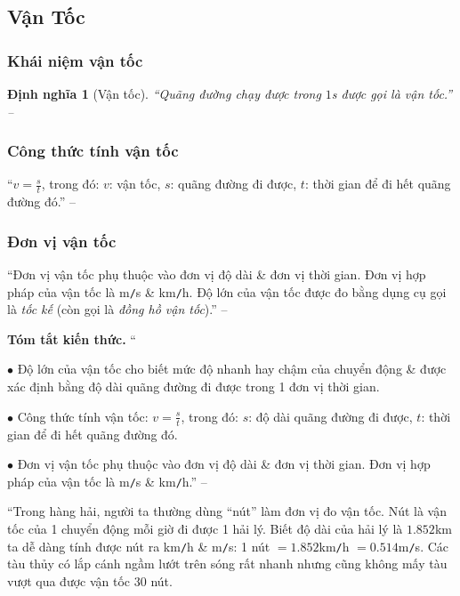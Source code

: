 \documentclass{article}
\numberwithin{equation}{section}
\newtheorem{dinhnghia}{Định nghĩa}[section]
\begin{document}
\subsection{Vận Tốc}

\subsubsection{Khái niệm vận tốc}

\begin{dinhnghia}[Vận tốc]
	``Quãng đường chạy được trong $1$s được gọi là \emph{vận tốc}.'' -- \cite[p. 8]{SGK_Vat_Ly_8}
\end{dinhnghia}

\subsubsection{Công thức tính vận tốc}
``$v = \frac{s}{t}$, trong đó: $v$: vận tốc, $s$: quãng đường đi được, $t$: thời gian để đi hết quãng đường đó.'' -- \cite[p. 9]{SGK_Vat_Ly_8}

\subsubsection{Đơn vị vận tốc}
``Đơn vị vận tốc phụ thuộc vào đơn vị độ dài \& đơn vị thời gian. Đơn vị hợp pháp của vận tốc là m\texttt{/}s \& km\texttt{/}h. Độ lớn của vận tốc được đo bằng dụng cụ gọi là \textit{tốc kế} (còn gọi là \textit{đồng hồ vận tốc}).'' -- \cite[p. 9]{SGK_Vat_Ly_8}
\vspace{2mm}

\noindent\textbf{Tóm tắt kiến thức.}
``\begin{enumerate*}
	\item[$\bullet$] Độ lớn của vận tốc cho biết mức độ nhanh hay chậm của chuyển động \& được xác định bằng độ dài quãng đường đi được trong 1 đơn vị thời gian.
	\item[$\bullet$] Công thức tính vận tốc: $v = \frac{s}{t}$, trong đó: $s$: độ dài quãng đường đi được, $t$: thời gian để đi hết quãng đường đó.
	\item[$\bullet$] Đơn vị vận tốc phụ thuộc vào đơn vị độ dài \& đơn vị thời gian. Đơn vị hợp pháp của vận tốc là m\texttt{/}s \& km\texttt{/}h.'' -- \cite[p. 10]{SGK_Vat_Ly_8}
\end{enumerate*}

``Trong hàng hải, người ta thường dùng ``nút'' làm đơn vị đo vận tốc. Nút là vận tốc của 1 chuyển động mỗi giờ đi được 1 hải lý. Biết độ dài của hải lý là $1.852$km ta dễ dàng tính được nút ra km\texttt{/}h \& m\texttt{/}s: 1 nút $= 1.852$km\texttt{/}h $= 0.514$m\texttt{/}s. Các tàu thủy có lắp cánh ngầm lướt trên sóng rất nhanh nhưng cũng không mấy tàu vượt qua được vận tốc $30$ nút.
\end{document}
